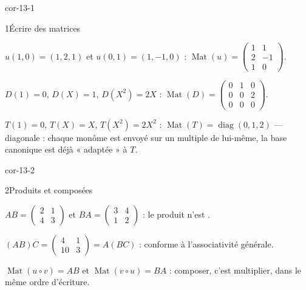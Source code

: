 
\corrigesSouples

\begin{blocLivre}{cor-13-1}
\begin{corrige}{1}{Écrire des matrices}
\begin{questions}
  \item $u(1,0)=(1,2,1)$ et $u(0,1)=(1,-1,0)$ :
    $\operatorname{Mat}(u)=\begin{pmatrix}1&1\\2&-1\\1&0\end{pmatrix}$.
  \item $D(1)=0$, $D(X)=1$, $D(X^{2})=2X$ :
    $\operatorname{Mat}(D)=\begin{pmatrix}0&1&0\\0&0&2\\0&0&0\end{pmatrix}$.
  \item $T(1)=0$, $T(X)=X$, $T(X^{2})=2X^{2}$ :
    $\operatorname{Mat}(T)=\operatorname{diag}(0,1,2)$ — diagonale : chaque
    monôme est envoyé sur un multiple de lui-même, la base canonique est
    déjà « adaptée » à $T$.
\end{questions}
\end{corrige}
\end{blocLivre}

\begin{blocLivre}{cor-13-2}
\begin{corrige}{2}{Produits et composées}
\begin{questions}
  \item $AB=\begin{pmatrix}2&1\\4&3\end{pmatrix}$ et
    $BA=\begin{pmatrix}3&4\\1&2\end{pmatrix}$ : le produit n'est
    .
  \item $(AB)C=\begin{pmatrix}4&1\\10&3\end{pmatrix}=A(BC)$ : conforme à
    l'associativité générale.
  \item $\operatorname{Mat}(u\circ v)=AB$ et
    $\operatorname{Mat}(v\circ u)=BA$ : composer, c'est multiplier, dans
    le même ordre d'écriture.
\end{questions}
\end{corrige}
\end{blocLivre}


